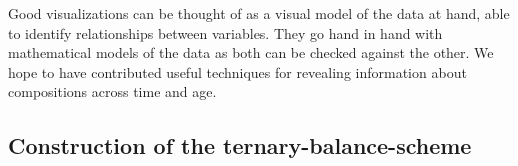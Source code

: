 \documentclass[a4paper]{scrartcl}
\begin{document}
Good visualizations can be thought of as a visual model of the data at hand, able to identify relationships between variables. They go hand in hand with mathematical models of the data as both can be checked against the other. We hope to have contributed useful techniques for revealing information about compositions across time and age.

\clearpage


\sloppy
\printbibliography

\clearpage


\begin{appendix}

\section{Construction of the ternary-balance-scheme}


\end{appendix}
\end{document}
